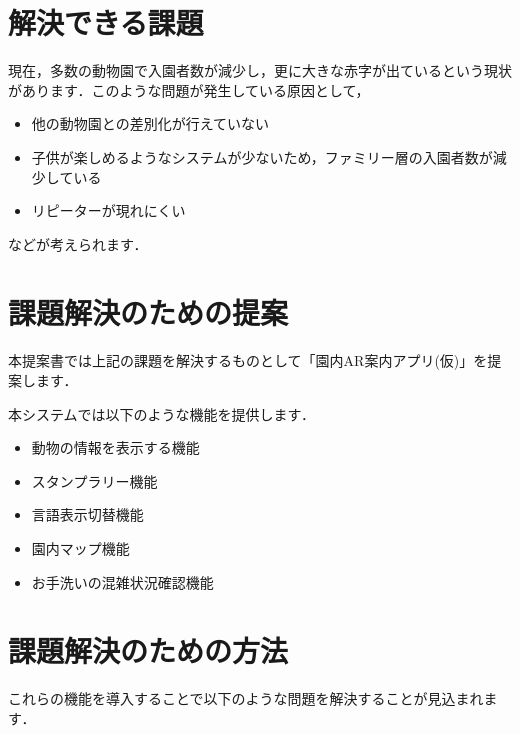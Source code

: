 \documentclass[a4j]{jarticle}
\begin{document}
\section{解決できる課題}
現在，多数の動物園で入園者数が減少し，更に大きな赤字が出ているという現状があります．このような問題が発生している原因として，
\begin{itemize}
	\item 他の動物園との差別化が行えていない
	\item 子供が楽しめるようなシステムが少ないため，ファミリー層の入園者数が減少している
	\item リピーターが現れにくい
\end{itemize}
などが考えられます．



\section{課題解決のための提案}
本提案書では上記の課題を解決するものとして「園内AR案内アプリ(仮)」を提案します．

本システムでは以下のような機能を提供します．

\begin{itemize}
	\item 動物の情報を表示する機能
	\item スタンプラリー機能
	\item 言語表示切替機能
	\item 園内マップ機能
	\item お手洗いの混雑状況確認機能
\end{itemize}


\section{課題解決のための方法}
これらの機能を導入することで以下のような問題を解決することが見込まれます．
\end{document}
